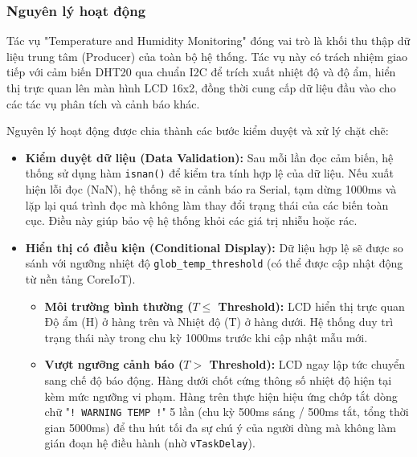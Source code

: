 \subsubsection{ Nguyên lý hoạt động}
Tác vụ "Temperature and Humidity Monitoring" đóng vai trò là khối thu thập dữ liệu trung tâm (Producer) của toàn bộ hệ thống. Tác vụ này có trách nhiệm giao tiếp với cảm biến DHT20 qua chuẩn I2C để trích xuất nhiệt độ và độ ẩm, hiển thị trực quan lên màn hình LCD 16x2, đồng thời cung cấp dữ liệu đầu vào cho các tác vụ phân tích và cảnh báo khác.

Nguyên lý hoạt động được chia thành các bước kiểm duyệt và xử lý chặt chẽ:
\begin{itemize}
    \item \textbf{Kiểm duyệt dữ liệu (Data Validation):} Sau mỗi lần đọc cảm biến, hệ thống sử dụng hàm \texttt{isnan()} để kiểm tra tính hợp lệ của dữ liệu. Nếu xuất hiện lỗi đọc (NaN), hệ thống sẽ in cảnh báo ra Serial, tạm dừng 1000ms và lặp lại quá trình đọc mà không làm thay đổi trạng thái của các biến toàn cục. Điều này giúp bảo vệ hệ thống khỏi các giá trị nhiễu hoặc rác.
    \item \textbf{Hiển thị có điều kiện (Conditional Display):} Dữ liệu hợp lệ sẽ được so sánh với ngưỡng nhiệt độ \texttt{glob\_temp\_threshold} (có thể được cập nhật động từ nền tảng CoreIoT).
    \begin{itemize}
        \item \textbf{Môi trường bình thường ($T \le$ Threshold):} LCD hiển thị trực quan Độ ẩm (H) ở hàng trên và Nhiệt độ (T) ở hàng dưới. Hệ thống duy trì trạng thái này trong chu kỳ 1000ms trước khi cập nhật mẫu mới.
        \item \textbf{Vượt ngưỡng cảnh báo ($T >$ Threshold):} LCD ngay lập tức chuyển sang chế độ báo động. Hàng dưới chốt cứng thông số nhiệt độ hiện tại kèm mức ngưỡng vi phạm. Hàng trên thực hiện hiệu ứng chớp tắt dòng chữ "\texttt{! WARNING TEMP !}" 5 lần (chu kỳ 500ms sáng / 500ms tắt, tổng thời gian 5000ms) để thu hút tối đa sự chú ý của người dùng mà không làm gián đoạn hệ điều hành (nhờ \texttt{vTaskDelay}).
    \end{itemize}
\end{itemize}


